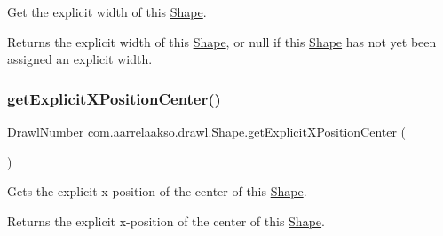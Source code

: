 Get the explicit width of this \hyperlink{classcom_1_1aarrelaakso_1_1drawl_1_1_shape}{Shape}. 

\begin{DoxyReturn}{Returns}
the explicit width of this \hyperlink{classcom_1_1aarrelaakso_1_1drawl_1_1_shape}{Shape}, or {\ttfamily null} if this \hyperlink{classcom_1_1aarrelaakso_1_1drawl_1_1_shape}{Shape} has not yet been assigned an explicit width. 
\end{DoxyReturn}
\mbox{\label{classcom_1_1aarrelaakso_1_1drawl_1_1_shape_aaecae2f51794b77ff2f76b1be64b0d90}} 
\subsubsection{\texorpdfstring{get\+Explicit\+X\+Position\+Center()}{getExplicitXPositionCenter()}}
{\footnotesize\ttfamily \hyperlink{classcom_1_1aarrelaakso_1_1drawl_1_1_drawl_number}{Drawl\+Number} com.\+aarrelaakso.\+drawl.\+Shape.\+get\+Explicit\+X\+Position\+Center (\begin{DoxyParamCaption}{ }\end{DoxyParamCaption})\hspace{0.3cm}{\ttfamily [protected]}}



Gets the explicit x-\/position of the center of this \hyperlink{classcom_1_1aarrelaakso_1_1drawl_1_1_shape}{Shape}. 

\begin{DoxyReturn}{Returns}
the explicit x-\/position of the center of this \hyperlink{classcom_1_1aarrelaakso_1_1drawl_1_1_shape}{Shape}. 
\end{DoxyReturn}
\mbox{\label{classcom_1_1aarrelaakso_1_1drawl_1_1_shape_a339cf8811f57b7cb5251109b04be953c}} 
